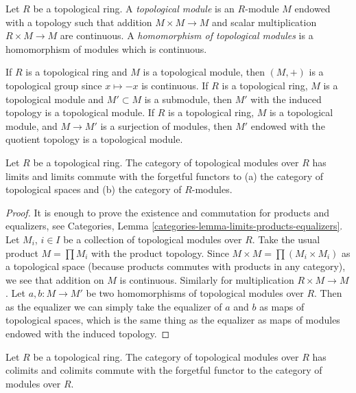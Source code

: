 \begin{definition}
\label{definition-topological-module}
Let $R$ be a topological ring. A {\it topological module} is an $R$-module
$M$ endowed with a topology such that addition $M \times M \to M$ and
scalar multiplication $R \times M \to M$ are continuous.
A {\it homomorphism of topological modules} is a homomorphism of
modules which is continuous.
\end{definition}

\noindent
If $R$ is a topological ring and $M$ is a topological module, then
$(M, +)$ is a topological group since $x \mapsto -x$ is continuous.
If $R$ is a topological ring, $M$ is a topological module and
$M' \subset M$ is a submodule, then $M'$ with the induced topology
is a topological module. If $R$ is a topological ring, $M$
is a topological module, and $M \to M'$ is a surjection of
modules, then $M'$ endowed with the quotient topology is a topological
module.

\begin{lemma}
\label{lemma-topological-module-limits}
Let $R$ be a topological ring. The category of topological modules over $R$
has limits and limits commute with the forgetful functors to
(a) the category of topological spaces and
(b) the category of $R$-modules.
\end{lemma}

\begin{proof}
It is enough to prove the existence and commutation for products and
equalizers, see
Categories, Lemma \ref{categories-lemma-limits-products-equalizers}.
Let $M_i$, $i \in I$ be a collection of topological modules over $R$.
Take the usual product $M = \prod M_i$ with the product topology.
Since $M \times M = \prod (M_i \times M_i)$ as a topological space
(because products commutes with products in any category), we
see that addition on $M$ is continuous. Similarly for multiplication
$R \times M \to M$.
Let $a, b : M \to M'$ be two homomorphisms of topological modules over $R$.
Then as the equalizer we can simply take the equalizer of $a$ and $b$
as maps of topological spaces, which is the same thing as the equalizer
as maps of modules endowed with the induced topology.
\end{proof}

\begin{lemma}
\label{lemma-topological-module-colimits}
Let $R$ be a topological ring. The category of topological modules over $R$
has colimits and colimits commute with the forgetful functor to the category
of modules over $R$.
\end{lemma}

